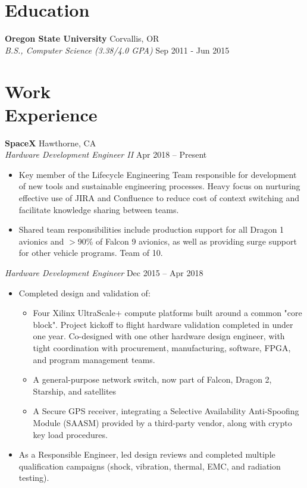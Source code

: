 \documentclass[10pt,letterpaper,margin]{res}
\newcommand{\org}[2]{{\bf #1} \hfill {\color{lightgray} #2} \\}
\newcommand{\pos}[2]{\small {\it #1} \hfill {\color{lightgray} #2} \vspace{0.0em}}
\begin{document}
\begin{resume}

\section{Education}

\org {Oregon State University} {Corvallis, OR}
\pos {B.S., Computer Science (3.38/4.0 GPA)} {Sep 2011 - Jun 2015}


\section{Work \\ Experience}

\org {SpaceX} {Hawthorne, CA}
\pos {Hardware Development Engineer II} {Apr 2018 -- Present}

\begin{itemize}
  \item Key member of the Lifecycle Engineering Team responsible for
    development of new tools and sustainable engineering processes. Heavy focus
    on nurturing effective use of JIRA and Confluence to reduce cost of context
    switching and facilitate knowledge sharing between teams.
  \item Shared team responsibilities include production support for all Dragon
    1 avionics and $>$90\% of Falcon 9 avionics, as well as providing
    surge support for other vehicle programs. Team of 10.
\end{itemize}


\pos {Hardware Development Engineer} {Dec 2015 -- Apr 2018}

\begin{itemize}
  \item Completed design and validation of:
    \begin{itemize}
      \item Four Xilinx UltraScale+ compute platforms built around a common
        "core block". Project kickoff to flight hardware validation completed
        in under one year. Co-designed with one other hardware design engineer,
        with tight coordination with procurement, manufacturing, software,
        FPGA, and program management teams.
      \item A general-purpose network switch, now part of Falcon, Dragon 2,
        Starship, and satellites
      \item A Secure GPS receiver, integrating a Selective Availability
        Anti-Spoofing Module (SAASM) provided by a third-party vendor, along
        with crypto key load procedures.
    \end{itemize}
  \item As a Responsible Engineer, led design reviews and completed multiple
    qualification campaigns (shock, vibration, thermal, EMC, and radiation
    testing).
\end{itemize}



\end{resume}
\end{document}
